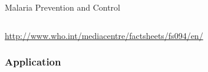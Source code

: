 \documentclass{beamer}
\begin{document}
\begin{frame}{Malaria Prevention and Control}
\begin{tabular}{ccc}
      \end{tabular}
      
      \url{http://www.who.int/mediacentre/factsheets/fs094/en/}



%
%
%



\end{frame}

\subsubsection{Application}
\end{document}
